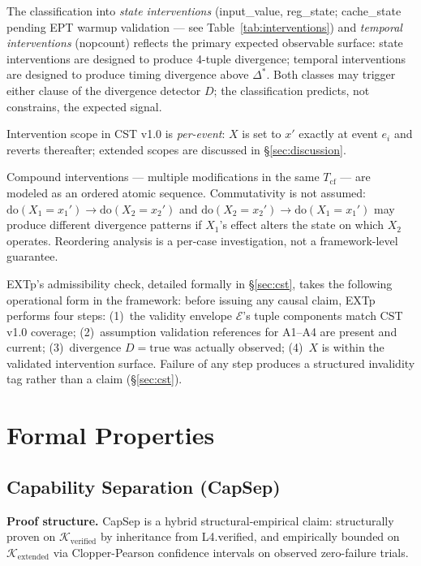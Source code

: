 \documentclass[conference]{IEEEtran}
\newcommand{\Tcf}{T_\text{cf}}
\newcommand{\Kverified}{\mathcal{K}_\text{verified}}
\newcommand{\Kextended}{\mathcal{K}_\text{extended}}
\newcommand{\Dstar}{\Delta^{*}}
\begin{document}
The classification into \emph{state interventions} (input\_value,
reg\_state; cache\_state pending EPT warmup validation --- see
Table~\ref{tab:interventions}) and \emph{temporal interventions}
(nopcount) reflects the primary expected observable surface: state
interventions are designed to produce 4-tuple divergence; temporal
interventions are designed to produce timing divergence above
$\Dstar$. Both classes may trigger either clause of the divergence
detector $D$; the classification predicts, not constrains, the
expected signal.

Intervention scope in CST v1.0 is \emph{per-event}: $X$ is set to
$x'$ exactly at event $e_i$ and reverts thereafter; extended scopes
are discussed in \S\ref{sec:discussion}.

Compound interventions --- multiple modifications in the same $\Tcf$
--- are modeled as an ordered atomic sequence. Commutativity is not
assumed: $\text{do}(X_1{=}x_1') \rightarrow \text{do}(X_2{=}x_2')$
and $\text{do}(X_2{=}x_2') \rightarrow \text{do}(X_1{=}x_1')$ may
produce different divergence patterns if $X_1$'s effect alters the
state on which $X_2$ operates. Reordering analysis is a per-case
investigation, not a framework-level guarantee.

EXTp's admissibility check, detailed formally in
\S\ref{sec:cst}, takes the following operational form in the
framework: before issuing any causal claim, EXTp performs four
steps: (1)~the validity envelope $\mathcal{E}$'s tuple components
match CST v1.0 coverage; (2)~assumption validation references for
A1--A4 are present and current; (3)~divergence $D{=}\text{true}$ was
actually observed; (4)~$X$ is within the validated intervention
surface. Failure of any step produces a structured invalidity tag
rather than a claim (\S\ref{sec:cst}).

\section{Formal Properties}\label{sec:properties}

\subsection{Capability Separation (CapSep)}\label{sec:capsep}

\textbf{Proof structure.} CapSep is a hybrid structural-empirical
claim: structurally proven on $\Kverified$ by inheritance from
L4.verified, and empirically bounded on $\Kextended$ via
Clopper-Pearson confidence intervals on observed zero-failure trials.
\end{document}
